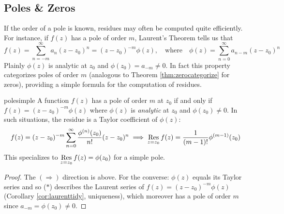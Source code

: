 \clearpage




\subsection{Poles \& Zeros}


If the order of a pole is known, residues may often be computed quite efficiently. For instance, if $f(z)$ has a pole of order $m$, Laurent's Theorem tells us that
\[
	f(z)=\sum_{n=-m}^\infty a_n(z-z_0)^n =(z-z_0)^{-m}\phi(z),
	\quad\text{where}\quad
	\phi(z)=\sum_{n=0}^\infty a_{n-m}(z-z_0)^n \tag{$\ast$}
\]
Plainly $\phi(z)$ is analytic at $z_0$ and $\phi(z_0)=a_{-m}\neq 0$. In fact this property categorizes poles of order $m$ (analogous to Theorem \ref{thm:zerocategorize} for zeros), providing a simple formula for the computation of residues. 


\begin{thm}{}{polesimple}
	A function $f(z)$ has a pole of order $m$ at $z_0$ if and only if $f(z)=(z-z_0)^{-m}\phi(z)$ where $\phi(z)$ is \emph{analytic} at $z_0$ and $\phi(z_0)\neq 0$. In such situations, the residue is a Taylor coefficient of $\phi(z)$:\footnotemark
	\[
		f(z)=(z-z_0)^{-m}\sum_{n=0}^\infty \frac{\phi^{(n)}(z_0)}{n!}(z-z_0)^n \implies \operatorname*{Res}_{z=z_0}f(z)=\frac 1{(m-1)!}\phi^{(m-1)}(z_0)
	\]
	This specializes to $\operatorname*{Res}\limits_{z=z_0}f(z)=\phi(z_0)$ for a simple pole.
\end{thm}



\begin{proof}
	The $(\Rightarrow)$ direction is above. For the converse: $\phi(z)$ equals its Taylor series and so ($\ast$) describes the Laurent series of $f(z)=(z-z_0)^{-m}\phi(z)$ (Corollary \ref{cor:laurenttidy}, uniqueness), which moreover has a pole of order $m$ since $a_{-m}=\phi(z_0)\neq 0$.
\end{proof}

